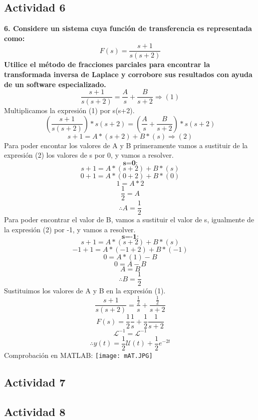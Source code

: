 {\subsection{Actividad 6}
\noindent\textbf{6. Considere un sistema cuya función de transferencia es representada como:
\[
F(s)=\frac{s+1}{s(s+2)}
\]
Utilice el método de fracciones parciales para encontrar la transformada inversa de Laplace y corrobore sus resultados con ayuda de un software especializado.}	
\[
\frac{s+1}{s(s+2)}=\frac{A}{s}+\frac{B}{s+2}{\Longrightarrow}(1)
\]
Multiplicamos la expresión (1) por s(s+2).
\[
(\frac{s+1}{s(s+2)})*s(s+2)=(\frac{A}{s}+\frac{B}{s+2})*s(s+2)
\]
\[
s+1=A*(s+2)+B*(s){\Longrightarrow}(2)
\]
Para poder encontar los valores de A y B primeramente vamos a sustituir de la expresión (2) los valores de s por 0, y vamos a resolver.
\[
\textbf{s=0:}
\]
\[
s+1=A*(s+2)+B*(s)
\]
\[
0+1=A*(0+2)+B*(0)
\]
\[
1=A*2
\]
\[
\frac{1}{2}=A
\]
\[
\therefore A=\frac{1}{2}
\]
Para poder encontrar el valor de B, vamos a sustituir el valor de s, igualmente de la expresión (2) por -1, y vamos a resolver.
\[
\textbf{s=-1:}
\]
\[
s+1=A*(s+2)+B*(s)
\]
\[
-1+1=A*(-1+2)+B*(-1)
\]
\[
0=A*(1)-B
\]
\[
0=A-B
\]
\[
A=B
\]
\[
\therefore B=\frac{1}{2}
\]
Sustituimos los valores de A y B en la expresión (1).
\[
\frac{s+1}{s(s+2)}=\frac{\frac{1}{2}}{s}+\frac{\frac{1}{2}}{s+2}
\]
\[
F(s)=\frac{1}{2}\frac{1}{s}+\frac{1}{2}\frac{1}{s+2}
\]
\[
\mathcal{L}^{-1}=\mathcal{L}^{-1}
\]
\[
\therefore{y(t)=\frac{1}{2}\mathscr{U}(t)+\frac{1}{2}e^{-2t}}
\]
Comprobación en MATLAB:
\texttt{[image: mAT.JPG]}

\subsection{Actividad 7}
\subsection{Actividad 8}

}
